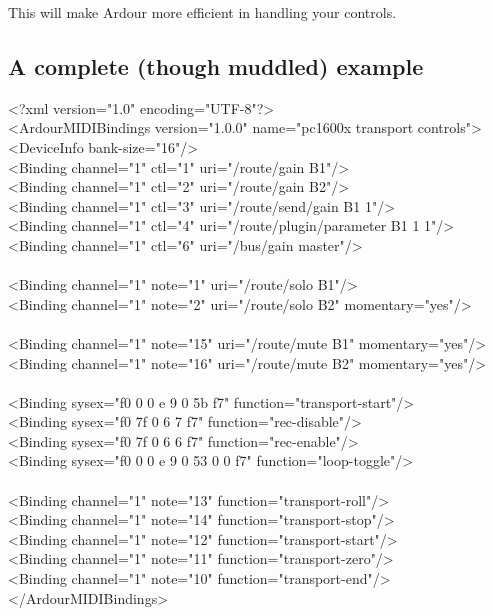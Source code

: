 \documentclass[10pt,a4paper]{book}
\begin{document}
This will make Ardour more efficient in handling your controls.

\subsection{A complete (though muddled) example}

\begin{listing}
<?xml version="1.0" encoding="UTF-8"?>\\
<ArdourMIDIBindings version="1.0.0" name="pc1600x transport controls">\\
<DeviceInfo bank-size="16"/>\\
<Binding channel="1" ctl="1"   uri="/route/gain B1"/>\\
<Binding channel="1" ctl="2"   uri="/route/gain B2"/>\\
<Binding channel="1" ctl="3"   uri="/route/send/gain B1 1"/>\\
<Binding channel="1" ctl="4"   uri="/route/plugin/parameter B1 1 1"/>\\
<Binding channel="1" ctl="6"   uri="/bus/gain master"/>\\
\\
<Binding channel="1" note="1"  uri="/route/solo B1"/>\\
<Binding channel="1" note="2"  uri="/route/solo B2" momentary="yes"/>\\
\\
<Binding channel="1" note="15"  uri="/route/mute B1" momentary="yes"/>\\
<Binding channel="1" note="16"  uri="/route/mute B2" momentary="yes"/>\\
\\
<Binding sysex="f0 0 0 e 9 0 5b f7" function="transport-start"/>\\
<Binding sysex="f0 7f 0 6 7 f7" function="rec-disable"/>\\
<Binding sysex="f0 7f 0 6 6 f7" function="rec-enable"/>\\
<Binding sysex="f0 0 0 e 9 0 53 0 0 f7" function="loop-toggle"/>\\
\\
<Binding channel="1" note="13" function="transport-roll"/>\\
<Binding channel="1" note="14" function="transport-stop"/>\\
<Binding channel="1" note="12" function="transport-start"/>\\
<Binding channel="1" note="11" function="transport-zero"/>\\
<Binding channel="1" note="10" function="transport-end"/>\\
</ArdourMIDIBindings>\\
\end{listing}
\end{document}
